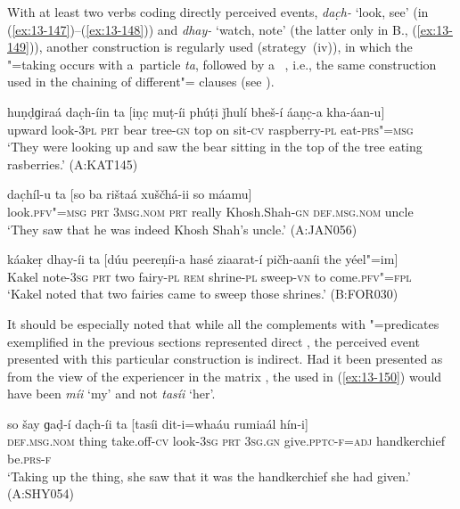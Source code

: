  With at least two verbs coding directly perceived events, \textit{dac̣h-} `look, see' (in (\ref{ex:13-147})--(\ref{ex:13-148})) and \textit{dhay-} `watch, note' (the latter only in B., (\ref{ex:13-149})), another construction is regularly used (strategy~(iv)), in which the  "=taking  occurs with a~particle \textit{ta}, followed by a~ , i.e., the same construction used in the chaining of different"= clauses (see ). 

\begin{exe}
\ex
\label{ex:13-147}
\gll huṇḍɡiraá dac̣h-íin ta [iṇc̣ muṭ-íi phúṭi ǰhulí  bheš-í áaṇc̣-a kha-áan-u] \\
upward look-\textsc{3pl} \textsc{prt} bear tree-\textsc{gn} top on sit-\textsc{cv} raspberry-\textsc{pl} eat-\textsc{prs"=msg}  \\
\glt `They were looking up and saw the bear sitting in the top of the tree eating rasberries.' (A:KAT145)

\ex
\label{ex:13-148}
\gll dac̣híl-u ta [so ba rištaá  xuščhá-ii so máamu] \\
look.\textsc{pfv"=msg} \textsc{prt} \textsc{3msg.nom} \textsc{prt} really Khosh.Shah-\textsc{gn} \textsc{def.msg.nom} uncle  \\
\glt `They saw that he was indeed Khosh Shah's uncle.' (A:JAN056)

\ex
\label{ex:13-149}
\gll káakeṛ dhay-íi ta [dúu peereṇíi-a hasé ziaarat-í  pičh-aaníi the yéel"=im] \\
Kakel note-\textsc{3sg} \textsc{prt} two fairy-\textsc{pl}  \textsc{rem} shrine-\textsc{pl} sweep-\textsc{vn} to come.\textsc{pfv"=fpl} \\
\glt `Kakel noted that two fairies came to sweep those shrines.' (B:FOR030) 
\end{exe}

It should be especially noted that while all the complements with "=predicates exemplified in the previous sections represented direct , the perceived event presented with this particular construction is indirect. Had it been presented as from the view of the experiencer in the matrix , the  used in (\ref{ex:13-150}) would have been \textit{míi} `my' and not \textit{tasíi} `her'.

\begin{exe}
\ex
\label{ex:13-150}
\gll so šay ɡaḍ-í dac̣h-íi ta [tasíi  dit-i=whaáu rumiaál hín-i] \\
\textsc{def.msg.nom} thing take.off-\textsc{cv} look-\textsc{3sg} \textsc{prt} \textsc{3sg.gn} give.\textsc{pptc-f}=\textsc{adj} handkerchief be.\textsc{prs-f} \\
\glt `Taking up the thing, she saw that it was the handkerchief she had given.' (A:SHY054)
\end{exe}


